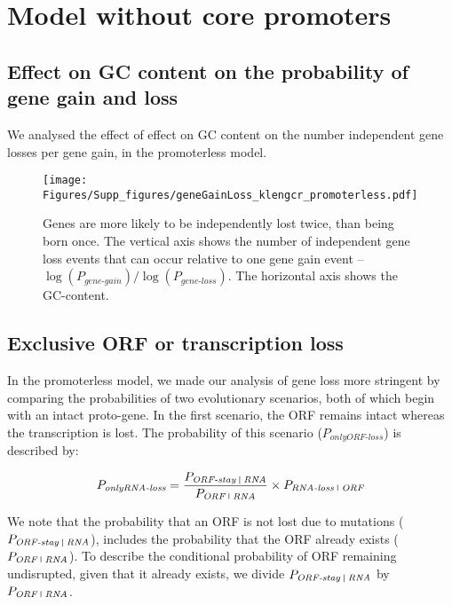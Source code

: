 \documentclass[12pt,a4paper]{article}
\begin{document}
\clearpage

\section{Model without core promoters}


\subsection{Effect on GC content on the probability of gene gain and loss}

We analysed the effect of effect on GC content on the number independent gene losses per gene gain, in the promoterless model.

\begin{figure}[H]
\centering
\texttt{[image: Figures/Supp\_figures/geneGainLoss\_klengcr\_promoterless.pdf]}
\caption{Genes are more likely to be independently lost twice, than being born once. The vertical axis shows the number of independent gene loss events that can occur relative to one gene gain event -- $\log(P_\textit{gene-gain})/\log(P_\textit{gene-loss})$. The horizontal axis shows the GC-content.}
\end{figure}

\subsection{Exclusive ORF or transcription loss}

In the promoterless model, we made our analysis of gene loss more stringent by comparing the probabilities of two evolutionary scenarios, both of which begin with an intact proto-gene. In the first scenario, the ORF remains intact whereas the transcription is lost. The probability of this scenario ($P_\textit{onlyORF-loss}$) is described by: 

\vspace{-1ex}

\begin{equation}
P_\textit{onlyRNA-loss} = \frac{P_\textit{ORF-stay \vline\ RNA}}{P_\textit{ORF \vline \ RNA}} \times P_\textit{RNA-loss \vline\ ORF}
\end{equation}

We note that the probability that an ORF is not lost due to mutations ($P_\textit{ORF-stay \vline \ RNA}$), includes the probability that the ORF already exists ($P_\textit{ORF \vline \ RNA}$). To describe the conditional probability of ORF remaining undisrupted, given that it already exists, we divide $P_\textit{ORF-stay \vline \ RNA}$ by $P_\textit{ORF \vline \ RNA}$.
\end{document}
